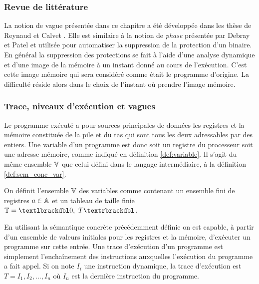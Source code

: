 \subsubsection{Revue de littérature}
La notion de vague présentée dans ce chapitre a été développée dans les thèse de Reynaud \cite{Reynaud2010} et Calvet \cite{Calvet2013}.
Elle est similaire à la notion de \emph{phase} présentée par Debray et Patel \cite{DP10} et utilisée pour automatiser la suppression de la protection d'un binaire.
En général la suppression des protections se fait à l'aide d'une analyse dynamique et d'une image de la mémoire à un instant donné au cours de l'exécution. C'est cette image mémoire qui sera considéré comme était le programme d'origine. La difficulté réside alors dans le choix de l'instant où prendre l'image mémoire.


\subsubsection{Trace, niveaux d'exécution et vagues}
Le programme exécuté a pour sources principales de données les registres et la mémoire constituée de la pile et du tas qui sont tous les deux adressables par des entiers. Une variable d'un programme est donc soit un registre du processeur soit une adresse mémoire, comme indiqué en définition \ref{def:variable}. Il s'agit du même ensemble $\mathbb V$ que celui défini dans le langage intermédiaire, à la définition \ref{def:sem_conc_var}.
\begin{defi}
On définit l'ensemble $\mathbb V$ des variables comme contenant un ensemble fini de registres $a\in\mathbb A$ et un tableau de taille finie $\mathbb{T}=\textlbrackdbl 0,\ T\textrbrackdbl$.
\label{def:variable}
\end{defi}

En utilisant la sémantique concrète précédemment définie on est capable, à partir d'un ensemble de valeurs initiales pour les registres et la mémoire, d'exécuter un programme sur cette entrée.
Une trace d'exécution d'un programme est simplement l'enchaînement des instructions auxquelles l'exécution du programme a fait appel. Si on note $I_i$ une instruction dynamique, la trace d'exécution est $T=I_1, I_2, ..., I_n$ où $I_n$ est la dernière instruction du programme.

